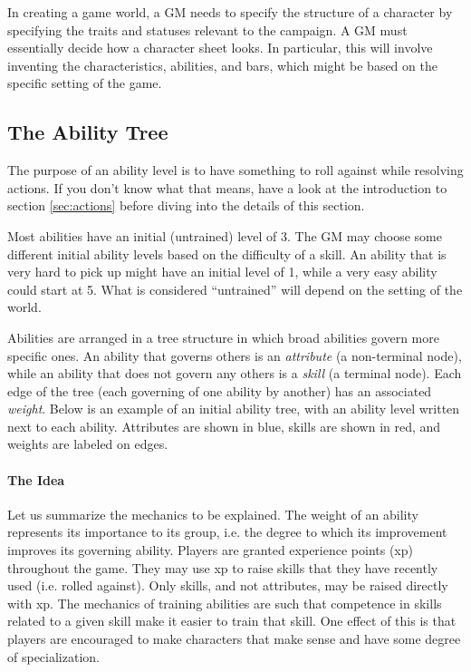 \documentclass[12pt]{article}
\begin{document}
In creating a game world, a GM needs to specify the structure of a character by specifying the traits and statuses relevant to the campaign. A GM must essentially decide how a character sheet looks. In particular, this will involve inventing the characteristics, abilities, and bars, which might be based on the specific setting of the game.

\subsection{The Ability Tree}\label{sec:tree}			

The purpose of an ability level is to have something to roll against while resolving actions. If you don't know what that means, have a look at the introduction to section \ref{sec:actions} before diving into the details of this section.

Most abilities have an initial (untrained) level of 3. The GM may choose some different initial ability levels based on the difficulty of a skill. An ability that is very hard to pick up might have an initial level of 1, while a very easy ability could start at 5. What is considered ``untrained'' will depend on the setting of the world.

Abilities are arranged in a tree structure in which broad abilities govern more specific ones.
An ability that governs others is an \emph{attribute} (a non-terminal node), while an ability that does not govern any others is a \emph{skill} (a terminal node).
Each edge of the tree (each governing of one ability by another) has an associated \emph{weight}.
Below is an example of an initial ability tree, with an ability level written next to each ability.
Attributes are shown in blue, skills are shown in red, and weights are labeled on edges.

\begin{center}

\end{center}

\paragraph{The Idea} Let us summarize the mechanics to be explained. The weight of an ability represents its importance to its group, i.e. the degree to which its improvement improves its governing ability.
Players are granted experience points (xp) throughout the game. They may use xp to raise skills that they have recently used (i.e. rolled against).
Only skills, and not attributes, may be raised directly with xp.
The mechanics of training abilities are such that competence in skills related to a given skill make it easier to train that skill.
One effect of this is that players are encouraged
to make characters that make sense and have some degree of specialization.
\end{document}
